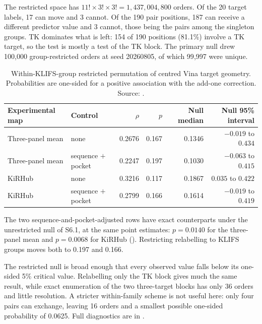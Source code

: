 The restricted space has $11!\times 3!\times 3! = 1{,}437{,}004{,}800$ orders. Of the 20 target
labels, 17 can move and 3 cannot. Of the 190 pair positions, 187 can receive a different
predictor value and 3 cannot, those being the pairs among the singleton groups. TK dominates
what is left: 154 of 190 positions (81.1\%) involve a TK target, so the test is mostly a test of
the TK block. The primary null drew 100{,}000 group-restricted orders at seed 20260805, of which
99{,}997 were unique.

\begin{table}[htbp]
\centering
\small
\setlength{\tabcolsep}{4pt}
\caption[Within-KLIFS-group restricted permutation]{Within-KLIFS-group restricted permutation of centred Vina target geometry. Probabilities
are one-sided for a positive association with the add-one correction. Source:
.}
\label{tab:s6-restricted}
\begin{tabular}{llrrrr}
\toprule
Experimental map & Control & $\rho$ & $p$ & Null median & Null 95\% interval \\
\midrule
Three-panel mean & none & 0.2676 & 0.167 & 0.1346 & $-0.019$ to $0.434$ \\
Three-panel mean & sequence $+$ pocket & 0.2247 & 0.197 & 0.1030 & $-0.063$ to $0.415$ \\
KiRHub & none & 0.3216 & 0.117 & 0.1867 & $0.035$ to $0.422$ \\
KiRHub & sequence $+$ pocket & 0.2799 & 0.166 & 0.1614 & $-0.019$ to $0.419$ \\
\bottomrule
\end{tabular}
\end{table}

The two sequence-and-pocket-adjusted rows have exact counterparts under the unrestricted null of
S6.1, at the same point estimates: $p=0.0140$ for the three-panel mean and $p=0.0068$ for KiRHub
(). Restricting relabelling to KLIFS
groups moves both to 0.197 and 0.166.

The restricted null is broad enough that every observed value falls below its one-sided 5\%
critical value. Relabelling only the TK block gives much the same result, while exact enumeration
of the two three-target blocks has only 36 orders and little resolution. A stricter within-family
scheme is not useful here: only four pairs can exchange, leaving 16 orders and a smallest possible
one-sided probability of 0.0625. Full diagnostics are in
.

